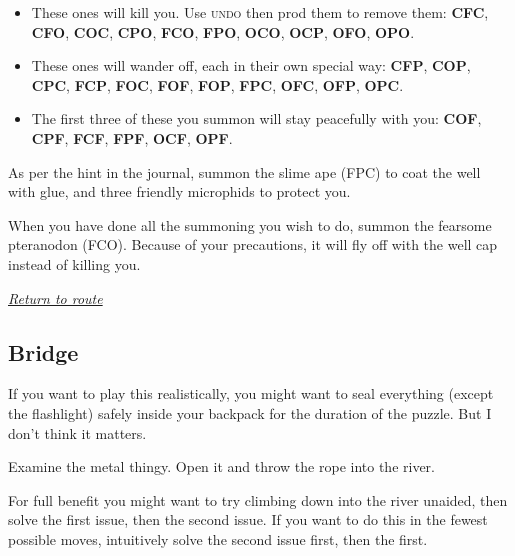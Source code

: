 \documentclass[a5paper]{extarticle}
\begin{document}
\begin{itemize}
\item
These ones will kill you. Use \textsc{undo} then prod them to remove them:\newline
\textbf{CFC},\enskip
\textbf{CFO},\enskip
\textbf{COC},\enskip
\textbf{CPO},\enskip
\textbf{FCO},\enskip
\textbf{FPO},\enskip
\textbf{OCO},\enskip
\textbf{OCP},\enskip
\textbf{OFO},\enskip
\textbf{OPO}.

\item
These ones will wander off, each in their own special way:\newline
\textbf{CFP},\enskip
\textbf{COP},\enskip
\textbf{CPC},\enskip
\textbf{FCP},\enskip
\textbf{FOC},\enskip
\textbf{FOF},\enskip
\textbf{FOP},\enskip
\textbf{FPC},\enskip
\textbf{OFC},\enskip
\textbf{OFP},\enskip
\textbf{OPC}.

\item
The first three of these you summon will stay peacefully with you:\newline
\textbf{COF},\enskip
\textbf{CPF},\enskip
\textbf{FCF},\enskip
\textbf{FPF},\enskip
\textbf{OCF},\enskip
\textbf{OPF}.
\end{itemize}

As per the hint in the journal, summon the slime ape (FPC) to coat the well with glue, and three friendly microphids to protect you.

When you have done all the summoning you wish to do,
summon the fearsome pteranodon (FCO).
Because of your precautions, it will fly off with the well cap instead of killing you.

\hyperref[sec:route-2]{\emph{Return to route}}

\newpage
\subsection{Bridge}\label{sec:sol-Bridge}

If you want to play this realistically, you might want to seal everything
(except the flashlight) safely inside your backpack for the duration of the puzzle.
But I don't think it matters.

Examine the metal thingy. Open it and throw the rope into the river.

For full benefit you might want to try climbing down into the river unaided,
then solve the first issue, then the second issue. If you want to do this in the
fewest possible moves, intuitively solve the second issue first, then the first.
\end{document}
